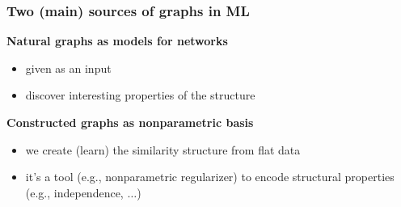 \documentclass{beamer}
\begin{document}
\newcommand{\misoclasstinytitleslide}{}
\newcommand{\misoclassdate}{}
\MakeTitleSlide

\begin{frame}
\frametitle{\textbf{Two (main) sources of graphs in ML}}

\textbf{Natural graphs as models for networks}
\begin{itemize}\addtolength{\itemsep}{.25\baselineskip}
\item<2-> {given as an input} 
\item<3-> discover interesting properties of the structure
\end{itemize}

\vspace{\baselineskip}
\textbf{Constructed graphs as nonparametric basis}
\begin{itemize}\addtolength{\itemsep}{0.25\baselineskip}
\item<4-> we create (learn) the similarity structure from flat data
\item<5-> it's a tool (e.g., nonparametric regularizer) to encode structural properties (e.g., independence, $\dots$)
\end{itemize}
\end{frame}
\end{document}
